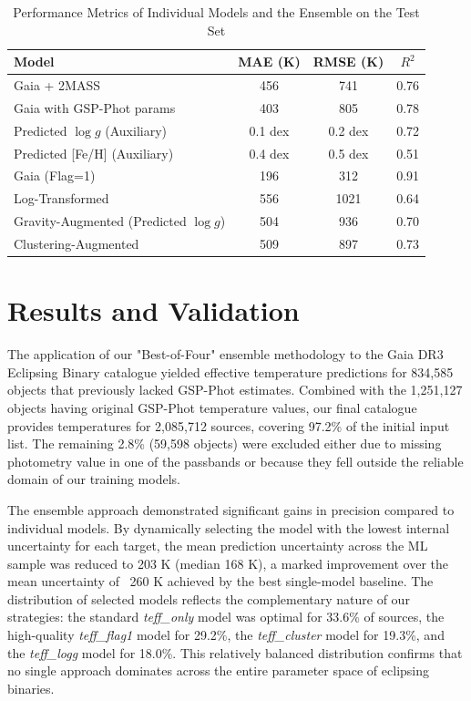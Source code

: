 \documentclass[preprint,12pt,authoryear]{elsarticle}
\begin{document}
\begin{table}[htbp]
\centering
\caption{Performance Metrics of Individual Models and the Ensemble on the Test Set}
\label{tab:model_metrics}
\begin{tabular}{l c c c}
\hline
\textbf{Model} & \textbf{MAE (K)} & \textbf{RMSE (K)} & \textbf{$R^2$} \\
\hline
Gaia + 2MASS & 456 & 741 & 0.76 \\
Gaia with GSP-Phot params & 403 & 805 & 0.78 \\
Predicted $\log g$ (Auxiliary) & 0.1 dex & 0.2 dex & 0.72 \\
Predicted [Fe/H] (Auxiliary) & 0.4 dex & 0.5 dex & 0.51 \\
\hline
Gaia (Flag=1) & 196 & 312 & 0.91 \\
Log-Transformed & 556 & 1021 & 0.64 \\
Gravity-Augmented (Predicted $\log g$) & 504 & 936 & 0.70 \\
Clustering-Augmented & 509 & 897 & 0.73 \\
\hline
\end{tabular}
\end{table}


\section{Results and Validation}
\label{sec:results}

The application of our "Best-of-Four" ensemble methodology to the Gaia DR3 Eclipsing Binary catalogue yielded effective temperature predictions for 834,585 objects that previously lacked GSP-Phot estimates. 
Combined with the 1,251,127 objects having original GSP-Phot temperature values, our final catalogue provides temperatures for 2,085,712 sources, covering 97.2\% of the initial input list. 
The remaining 2.8\% (59,598 objects) were excluded either due to missing photometry value in one of the passbands or because they fell outside the reliable domain of our training models.

The ensemble approach demonstrated significant gains in precision compared to individual models. 
By dynamically selecting the model with the lowest internal uncertainty for each target, the mean prediction uncertainty across the ML sample was reduced to 203 K (median 168 K), a marked improvement over the mean uncertainty of ~260 K achieved by the best single-model baseline. 
The distribution of selected models reflects the complementary nature of our strategies: 
the standard \textit{teff\_only} model was optimal for 33.6\% of sources, 
the high-quality \textit{teff\_flag1} model for 29.2\%, 
the \textit{teff\_cluster} model for 19.3\%, 
and the \textit{teff\_logg} model for 18.0\%. 
This relatively balanced distribution confirms that no single approach dominates across the entire parameter space of eclipsing binaries.
\end{document}
